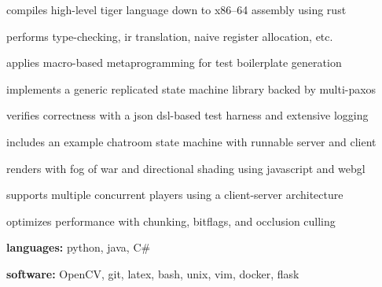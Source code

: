 \documentclass{resume}
\begin{document}
\begin{projects}
    \begin{description}
        \item compiles high-level tiger language down to x86--64 assembly using rust
        \item performs type-checking, ir translation, naive register allocation, etc.
        \item applies macro-based metaprogramming for test boilerplate generation
    \end{description}

    \begin{description}
        \item implements a generic replicated state machine library backed by multi-paxos
        \item verifies correctness with a json dsl-based test harness and extensive logging
        \item includes an example chatroom state machine with runnable server and client
    \end{description}

    \begin{description}
        \item renders with fog of war and directional shading using javascript and webgl
        \item supports multiple concurrent players using a client-server architecture
        \item optimizes performance with chunking, bitflags, and occlusion culling
    \end{description}
\end{projects}

\begin{skills}
    \begin{description}
        \item \textbf{languages:} python, java, C\#
        \item \textbf{software:} OpenCV, git, latex, bash, unix, vim, docker, flask
    \end{description}
\end{skills}
\end{document}
